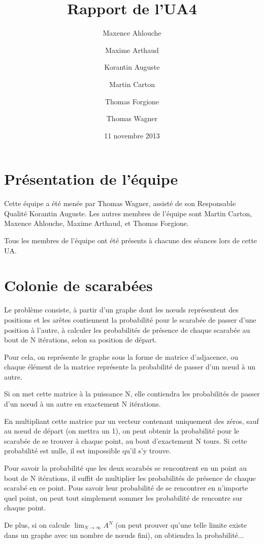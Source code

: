 \documentclass{scrartcl}
\begin{document}
\title{Rapport de l'UA4}
\author{Maxence Ahlouche \and Maxime Arthaud \and Korantin Auguste
          \and Martin Carton \and Thomas Forgione \and Thomas Wagner}
\date{11 novembre 2013}
\maketitle
\tableofcontents
\newpage

\section{Présentation de l'équipe}
  Cette équipe a été menée par Thomas Wagner, assisté de son Responsable
  Qualité Korantin Auguste. Les autres membres de l'équipe sont Martin Carton,
  Maxence Ahlouche, Maxime Arthaud, et Thomas Forgione.

  Tous les membres de l'équipe ont été présents à chacune des séances lors de
  cette UA.

\section{Colonie de scarabées}

  Le problème consiste,  à partir d'un graphe dont les nœuds représentent des
  positions et les arêtes contiennent la probabilité pour le scarabée de passer
  d'une position à l'autre, à calculer les probabilités de présence de chaque scarabée
  au bout de N itérations, selon sa position de départ.

  Pour cela, on représente le graphe sous la forme de matrice d'adjacence, ou chaque
  élément de la matrice représente la probabilité de passer d'un nœud à un autre.

  Si on met cette matrice à la puissance N, elle contiendra les probabilités de passer
  d'un nœud à un autre en exactement N itérations.

  En multipliant cette matrice par un vecteur contenant uniquement des zéros, sauf au nœud
  de départ (on mettra un 1), on peut obtenir la probabilité pour le scarabée de se trouver
  à chaque point, au bout d'exactement N tours.
  Si cette probabilité est nulle, il est impossible qu'il s'y trouve.

  Pour savoir la probabilité que les deux scarabés se rencontrent en un point au bout de N itérations,
  il suffit de multiplier les probabilités de présence de chaque scarabé en ce point.
  Pous savoir leur probabilité de se rencontrer en n'importe quel point, on peut tout simplement sommer
  les probabilité de rencontre sur chaque point.

  De plus, si on calcule $\lim_{N \to \infty} A^N$ (on peut prouver qu'une telle limite existe dans un graphe
  avec un nombre de nœuds fini), on obtiendra la probabilité...
\end{document}
